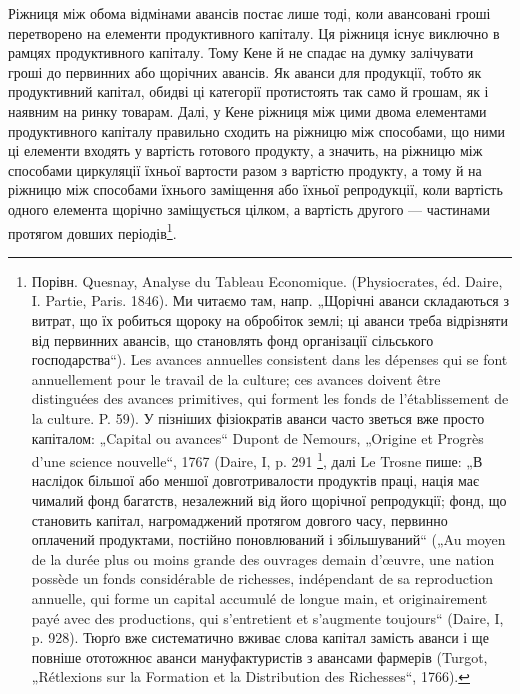 Ріжниця між обома відмінами авансів постає лише тоді, коли авансовані
гроші перетворено на елементи продуктивного капіталу. Ця ріжниця
існує виключно в рамцях продуктивного капіталу. Тому Кене й не спадає
на думку залічувати гроші до первинних або щорічних авансів. Як аванси
для продукції, тобто як продуктивний капітал, обидві ці категорії протистоять
так само й грошам, як і наявним на ринку товарам. Далі, у Кене
ріжниця між цими двома елементами продуктивного капіталу правильно
сходить на ріжницю між способами, що ними ці елементи входять у вартість
готового продукту, а значить, на ріжницю між способами циркуляції
їхньої вартости разом з вартістю продукту, а тому й на ріжницю
між способами їхнього заміщення або їхньої репродукції, коли вартість
одного елемента щорічно заміщується цілком, а вартість другого — частинами
протягом довших періодів\footnote{
Порівн. Quesnay, Analyse du Tableau Economique. (Physiocrates, éd. Daire,
I. Partie, Paris. 1846). Ми читаємо там, напр. „Щорічні аванси складаються з витрат,
що їх робиться щороку на обробіток землі; ці аванси треба відрізняти від первинних
авансів, що становлять фонд організації сільського господарства“). Les
avances annuelles consistent dans les dépenses qui se font annuellement pour le
travail de la culture; ces avances doivent être distinguées des avances primitives,
qui forment les fonds de l’établissement de la culture. P. 59). У пізніших фізіократів
аванси часто зветься вже просто капіталом: „Capital ou avances“ Dupont de
Nemours, „Origine et Progrès d’une science nouvelle“, 1767 (Daire, I, p. 291 \footnote*{
Цитоване місце є не в статті „Origine et Progrès“, 1767 (Daire, I, p. 291),
a в статті „Maximes du docteur Quesnay“ (Daire, I, p. 391). \emph{Ред.}
},
далі Le Trosne пише: „В наслідок більшої або меншої довготривалости продуктів
праці, нація має чималий фонд багатств, незалежний від його щорічної
репродукції; фонд, що становить капітал, нагромаджений протягом довгого
часу, первинно оплачений продуктами, постійно поновлюваний і збільшуваний“
(„Au moyen de la durée plus ou moins grande des ouvrages demain d'œuvre, une
nation possède un fonds considérable de richesses, indépendant de sa reproduction
annuelle, qui forme un capital accumulé de longue main, et originairement payé
avec des productions, qui s'entretient et s’augmente toujours“ (Daire, I, p. 928).
Тюрґо вже систематично вживає слова капітал замість аванси і ще повніше ототожнює
аванси мануфактуристів з авансами фармерів (Turgot, „Rétlexions sur la
Formation et la Distribution des Richesses“, 1766).
}.

